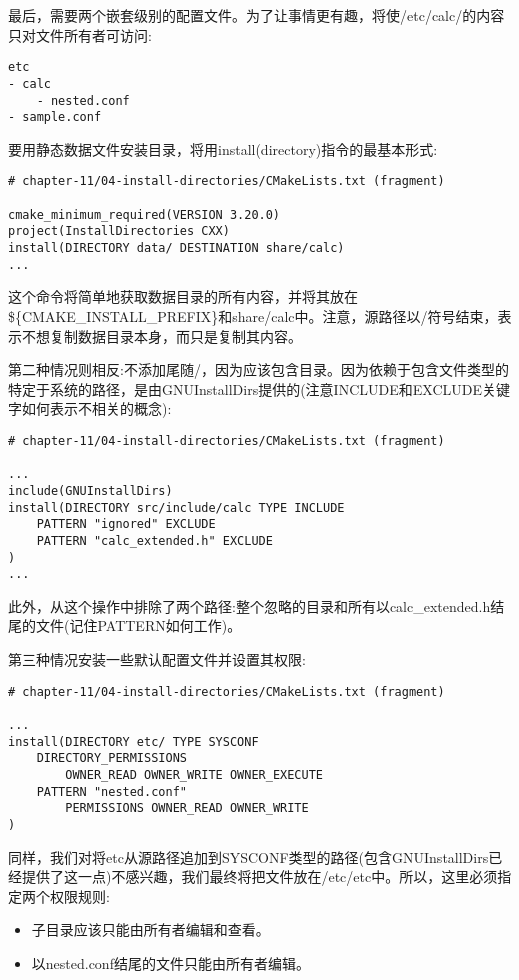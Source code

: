 最后，需要两个嵌套级别的配置文件。为了让事情更有趣，将使/etc/calc/的内容只对文件所有者可访问:

\begin{lstlisting}[style=stylePython]
etc
- calc
	- nested.conf
- sample.conf
\end{lstlisting}

要用静态数据文件安装目录，将用install(directory)指令的最基本形式:

\begin{lstlisting}[style=styleCMake]
# chapter-11/04-install-directories/CMakeLists.txt (fragment)

cmake_minimum_required(VERSION 3.20.0)
project(InstallDirectories CXX)
install(DIRECTORY data/ DESTINATION share/calc)
...
\end{lstlisting}

这个命令将简单地获取数据目录的所有内容，并将其放在\$\{CMAKE\_INSTALL\_PREFIX\}和share/calc中。注意，源路径以/符号结束，表示不想复制数据目录本身，而只是复制其内容。

第二种情况则相反:不添加尾随/，因为应该包含目录。因为依赖于包含文件类型的特定于系统的路径，是由GNUInstallDirs提供的(注意INCLUDE和EXCLUDE关键字如何表示不相关的概念):

\begin{lstlisting}[style=styleCMake]
# chapter-11/04-install-directories/CMakeLists.txt (fragment)

...
include(GNUInstallDirs)
install(DIRECTORY src/include/calc TYPE INCLUDE
	PATTERN "ignored" EXCLUDE
	PATTERN "calc_extended.h" EXCLUDE
)
...
\end{lstlisting}

此外，从这个操作中排除了两个路径:整个忽略的目录和所有以calc\_extended.h结尾的文件(记住PATTERN如何工作)。

第三种情况安装一些默认配置文件并设置其权限:

\begin{lstlisting}[style=styleCMake]
# chapter-11/04-install-directories/CMakeLists.txt (fragment)

...
install(DIRECTORY etc/ TYPE SYSCONF
	DIRECTORY_PERMISSIONS
		OWNER_READ OWNER_WRITE OWNER_EXECUTE
	PATTERN "nested.conf"
		PERMISSIONS OWNER_READ OWNER_WRITE
)
\end{lstlisting}

同样，我们对将etc从源路径追加到SYSCONF类型的路径(包含GNUInstallDirs已经提供了这一点)不感兴趣，我们最终将把文件放在/etc/etc中。所以，这里必须指定两个权限规则:

\begin{itemize}
\item 
子目录应该只能由所有者编辑和查看。

\item 
以nested.conf结尾的文件只能由所有者编辑。
\end{itemize}

